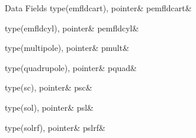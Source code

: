 \begin{DoxyFields}{Data Fields}
\mbox{\label{namespacebeamlineelemclass_ae25137b123a2ee3f55fb97372dcae2ae}} 
type(emfldcart), pointer&
pemfldcart&
\\
\hline

\mbox{\label{namespacebeamlineelemclass_a255e033e63b5b259d76ed6bf738a8cf6}} 
type(emfldcyl), pointer&
pemfldcyl&
\\
\hline

\mbox{\label{namespacebeamlineelemclass_aa189f35902f7b7265e0485c363023f28}} 
type(multipole), pointer&
pmult&
\\
\hline

\mbox{\label{namespacebeamlineelemclass_a4dc5bf2560031246e9c34bc11576b75c}} 
type(quadrupole), pointer&
pquad&
\\
\hline

\mbox{\label{namespacebeamlineelemclass_ad948a3ca9b39d5bc89fabe69a16b26f2}} 
type(sc), pointer&
psc&
\\
\hline

\mbox{\label{namespacebeamlineelemclass_a227ca9307b3706cafe607d50bc6efaec}} 
type(sol), pointer&
psl&
\\
\hline

\mbox{\label{namespacebeamlineelemclass_ae4662d217dff6d83c07fe77d93525c61}} 
type(solrf), pointer&
pslrf&
\\
\hline

\end{DoxyFields}

